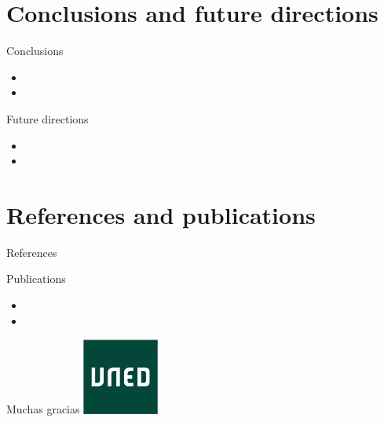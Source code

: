 \documentclass{beamer}
\begin{document}
\section{Conclusions and future directions}
\begin{frame}{Conclusions}
  \begin{itemize}
    \item
    \item
  \end{itemize}
\end{frame}
\begin{frame}{Future directions}
  \begin{itemize}
    \item
    \item
  \end{itemize}
\end{frame}

\section{References and publications}
\begin{frame}{References}


\end{frame}
\begin{frame}{Publications}
  \begin{itemize}
    \item
    \item
    \end{itemize}
\end{frame}

\begin{frame}{}
  \centering
  Muchas gracias
  \includegraphics[width=2.5cm]{logo}
\end{frame}
\end{document}
